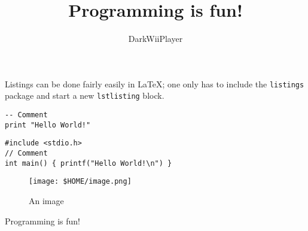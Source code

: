 \documentclass{article}
\title{Programming is fun!}
\author{DarkWiiPlayer}
\def\code#1{\texttt{#1}}
\begin{document}

\maketitle

Listings can be done fairly easily in LaTeX; one only has to include the \code{listings} package and start a new \code{lstlisting} block.

\begin{lstlisting}
-- Comment
print "Hello World!"
\end{lstlisting}

\begin{lstlisting}
#include <stdio.h>
// Comment
int main() { printf("Hello World!\n") }
\end{lstlisting}

\begin{figure}[h]
	\centering
	\texttt{[image: \$HOME/image.png]}
	\caption{An image}
	\label{fig:image1}
\end{figure}

Programming is fun! \cite{sicp}

\printbibliography
\end{document}
